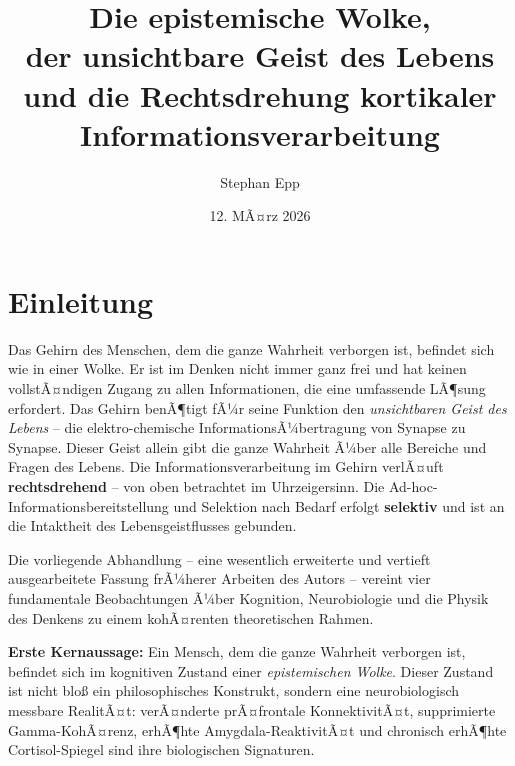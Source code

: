 ﻿\documentclass[12pt,a4paper]{report}
\title{\textbf{Die epistemische Wolke,\\ der unsichtbare Geist des Lebens\\ und die Rechtsdrehung kortikaler Informationsverarbeitung}}
\author{Stephan Epp}
\date{12. MÃ¤rz 2026}
\theoremstyle{plain}
\theoremstyle{definition}
\theoremstyle{remark}
\begin{document}
	\maketitle	
	\tableofcontents
	\newpage
	
	\chapter{Einleitung}
	Das Gehirn des Menschen, dem die ganze Wahrheit verborgen ist,
	befindet sich wie in einer Wolke. Er ist im Denken nicht immer
	ganz frei und hat keinen vollstÃ¤ndigen Zugang zu allen Informationen,
	die eine umfassende LÃ¶sung erfordert. Das Gehirn benÃ¶tigt fÃ¼r seine Funktion den \emph{unsichtbaren
		Geist des Lebens} -- die elektro-chemische InformationsÃ¼bertragung
	von Synapse zu Synapse. Dieser Geist allein gibt die ganze Wahrheit Ã¼ber alle Bereiche und Fragen des Lebens.
	Die Informationsverarbeitung im Gehirn verlÃ¤uft
	\textbf{rechtsdrehend} -- von oben betrachtet im Uhrzeigersinn. Die Ad-hoc-Informationsbereitstellung und Selektion nach Bedarf
	erfolgt \textbf{selektiv} und ist an die Intaktheit des
	Lebensgeistflusses gebunden.
	
	Die vorliegende Abhandlung -- eine wesentlich erweiterte und vertieft
	ausgearbeitete Fassung frÃ¼herer Arbeiten des Autors -- vereint vier
	fundamentale Beobachtungen Ã¼ber Kognition, Neurobiologie und die
	Physik des Denkens zu einem kohÃ¤renten theoretischen Rahmen.
	
	\textbf{Erste Kernaussage:} Ein Mensch, dem die ganze Wahrheit verborgen
	ist, befindet sich im kognitiven Zustand einer \emph{epistemischen Wolke}.
	Dieser Zustand ist nicht blo\ss{} ein philosophisches Konstrukt, sondern
	eine neurobiologisch messbare RealitÃ¤t: verÃ¤nderte prÃ¤frontale
	KonnektivitÃ¤t, supprimierte Gamma-KohÃ¤renz, erhÃ¶hte Amygdala-ReaktivitÃ¤t
	und chronisch erhÃ¶hte Cortisol-Spiegel sind ihre biologischen Signaturen.
	
\end{document}

